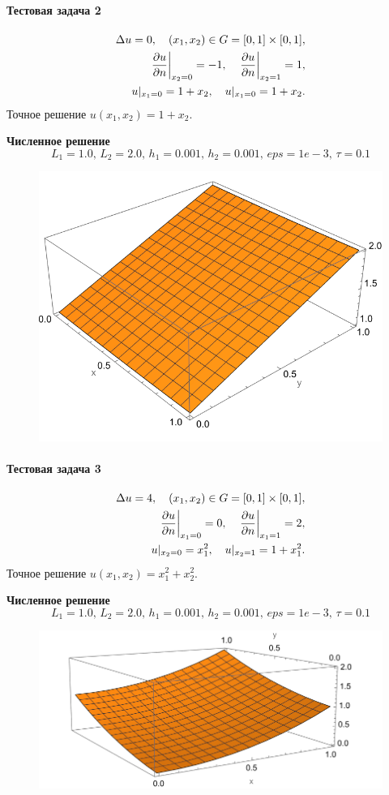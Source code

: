 \documentclass[12pt, a4paper]{article}
\begin{document}
		\paragraph{Тестовая задача 2}
		\begin{eqnarray*}
			\Delta u=0,\quad(x_1,x_2)\in G=[0,1]\times[0,1],\\
			\left.\frac{\partial u}{\partial n}\right|_{x_2=0}=-1,\quad\left.\frac{\partial u}{\partial n}\right|_{x_2=1}=1,\\
			u|_{x_1=0}=1+x_2,\quad u|_{x_1=0}=1+x_2.
		\end{eqnarray*}
		Точное решение $u(x_1,x_2)=1+x_2$.
		
		\textbf{Численное решение} $$L_1=1.0,\,L_2=2.0,\,h_1=0.001,\,h_2=0.001,\,eps=1e-3,\,\tau=0.1$$
		\begin{figure}[H]
			\centering
			\includegraphics[width=0.7\linewidth]{test2.png}
		\end{figure}
		\paragraph{Тестовая задача 3}
		\begin{eqnarray*}
			\Delta u=4,\quad(x_1,x_2)\in G=[0,1]\times[0,1],\\
			\left.\frac{\partial u}{\partial n}\right|_{x_1=0}=0,\quad\left.\frac{\partial u}{\partial n}\right|_{x_1=1}=2,\\
			u|_{x_2=0}=x_1^2,\quad u|_{x_2=1}=1+x_1^2.
		\end{eqnarray*}
		Точное решение $u(x_1,x_2)=x_1^2+x_2^2$.
		
		\textbf{Численное решение} $$L_1=1.0,\,L_2=2.0,\,h_1=0.001,\,h_2=0.001,\,eps=1e-3,\,\tau=0.1$$
		\begin{figure}[H]
			\centering
			\includegraphics[width=0.7\linewidth]{test3.png}
		\end{figure}
	
\end{document}
